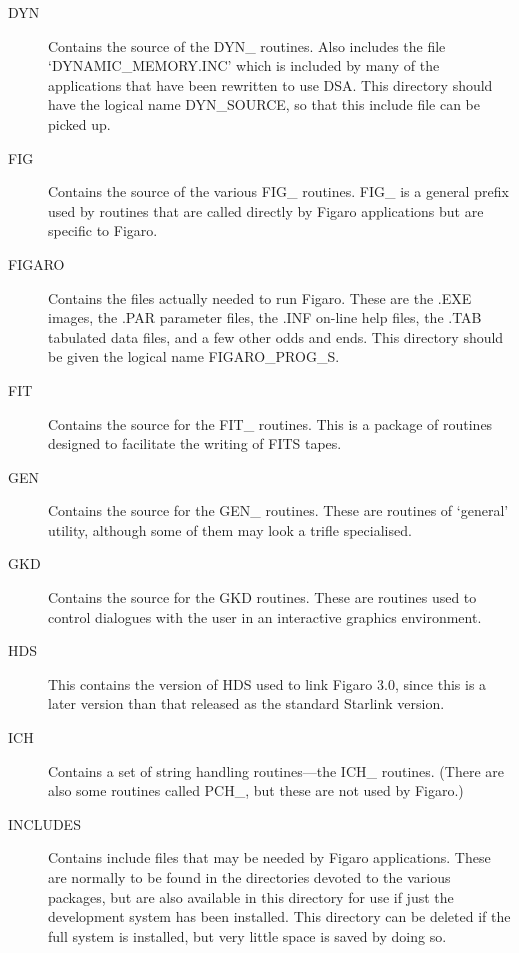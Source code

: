 \begin{description}
\item [DYN] Contains the source of the DYN\_ routines. Also includes the 
file `DYNAMIC\_MEMORY\-.INC' which is included by many of the applications
that have been rewritten to use DSA. This directory should have the
logical name DYN\_SOURCE, so that this include file can be picked up.


\item [FIG] Contains the source of the various FIG\_ routines. FIG\_ is
a general prefix used by routines that are called directly by Figaro
applications but are specific to Figaro.

\item [FIGARO] Contains the files actually needed to run Figaro. These 
are the .EXE images, the .PAR parameter files, the .INF on-line help 
files, the .TAB tabulated data files, and a few other odds and ends. This
directory should be given the logical name FIGARO\_PROG\_S.

\item [FIT] Contains the source for the FIT\_ routines. This is a package of
routines designed to facilitate the writing of FITS tapes.

\item [GEN] Contains the source for the GEN\_ routines. These are 
routines of `general' utility, although some of them may look a trifle
specialised.

\item [GKD] Contains the source for the GKD routines. These are routines used
to control dialogues with the user in an interactive graphics environment.

\item [HDS] This contains the version of HDS used to link Figaro 3.0, since
this is a later version than that released as the standard Starlink version.

\item [ICH] Contains a set of string handling routines---the ICH\_ routines. 
(There are also some routines called PCH\_, but these are not used by Figaro.)

\item [INCLUDES] Contains include files that may be needed by Figaro 
applications. These are normally to be found in the directories devoted to 
the various packages, but are also available in this directory for use if
just the development system has been installed. This directory can be
deleted if the full system is installed, but very little space is saved by
doing so.


\end{description}
